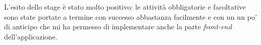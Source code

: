 L'esito dello stage è stato molto positivo: le attività obbligatorie e facoltative sono state portate a termine con successo abbastanza facilmente 
e con un un po' di anticipo che mi ha permesso di implementare anche la parte \textit{front-end} dell'applicazione.

%
%

\endgroup			

\vfill

